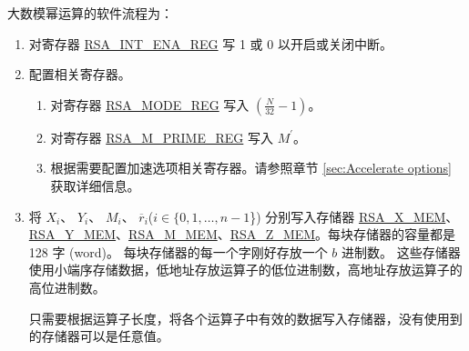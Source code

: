 \documentclass[main\_\_CN.tex]{subfiles}
\begin{document}
大数模幂运算的软件流程为：

\begin{enumerate}

    \item 对寄存器 \hyperref[regdesc:RSAINTENAREG]{RSA\_INT\_ENA\_REG} 写 1 或 0 以开启或关闭中断。

    \item 配置相关寄存器。

    \begin{enumerate}
        \item 对寄存器 \hyperref[regdesc:RSAMODEREG]{RSA\_MODE\_REG} 写入 \begin{math}( \frac{N}{32} - 1 )\end{math}。

        \item 对寄存器 \hyperref[regdesc:RSAMPRIMEREG]{RSA\_M\_PRIME\_REG} 写入 \begin{math}M^{\prime}\end{math}。

        \item 根据需要配置加速选项相关寄存器。请参照章节 \ref{sec:Accelerate options} 获取详细信息。
    \end{enumerate}

    \item 将
        \begin{math}X_{i}\end{math}、
        \begin{math}Y_{i}\end{math}、
        \begin{math}M_{i}\end{math}、
        \begin{math}\overline{r}_{i}\end{math}(\begin{math}i \in \{ 0, 1, \dots, n-1 \end{math}\})
        分别写入存储器 \hyperref[regdesc:RSAmemory]{RSA\_X\_MEM}、\hyperref[regdesc:RSAmemory]{\hyperref[regdesc:RSAmemory]{RSA\_Y\_MEM}}、\hyperref[regdesc:RSAmemory]{RSA\_M\_MEM}、\hyperref[regdesc:RSAmemory]{RSA\_Z\_MEM}。每块存储器的容量都是 128 字 (word)。
        每块存储器的每一个字刚好存放一个 \begin{math}b\end{math} 进制数。
        这些存储器使用小端序存储数据，低地址存放运算子的低位进制数，高地址存放运算子的高位进制数。

        只需要根据运算子长度，将各个运算子中有效的数据写入存储器，没有使用到的存储器可以是任意值。


\end{enumerate}
\end{document}
